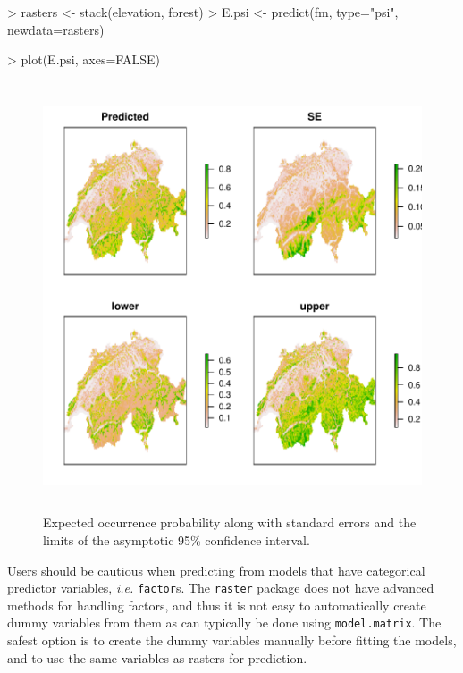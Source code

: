 \documentclass[a4paper]{article}
\renewenvironment{Schunk}{\vspace{\topsep}}{\vspace{\topsep}}
\begin{document}
\begin{Schunk}
\begin{Sinput}
> rasters <- stack(elevation, forest)
> E.psi <- predict(fm, type="psi", newdata=rasters)
\end{Sinput}
\begin{Sinput}
> plot(E.psi, axes=FALSE)
\end{Sinput}
\end{Schunk}
\begin{figure}[b!]
  \centering
\includegraphics[width=5in,height=5in]{spp-dist-predict}
\caption{Expected occurrence probability along with standard errors
  and the limits of the asymptotic 95\% confidence interval.}
\label{fig:predict}
\end{figure}

Users should be cautious when predicting from models that have
categorical predictor variables, \emph{i.e.} \verb+factor+s. The
\texttt{raster} package does not have advanced methods for handling
factors, and thus it is not easy to automatically create dummy
variables from them as can typically be done using
\verb+model.matrix+. The safest option is to create the dummy
variables manually before fitting the models, and to use the same
variables as rasters for prediction.



\end{document}
